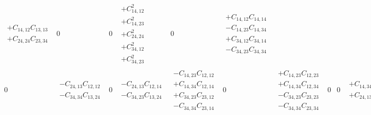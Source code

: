 \documentclass[pra,nofootinbib]{revtex4-1}
\newcommand{\C}[2]{C_{{#1},{#2}}}
\begin{document}
\begin{eqnarray}
\begin{array}{cccccccccccccccc}
\begin{array}{c}
     + \C{14}{12}\C{13}{13} \\
     + \C{24}{24}\C{23}{34} 
     \end{array} &
     0 &
     0 &
     \begin{array}{c}
     + \C{14}{12}^2 \\
     + \C{14}{23}^2 \\
     + \C{24}{24}^2 \\
     + \C{34}{12}^2 \\
     + \C{34}{23}^2 
     \end{array} &
     0 &
     \begin{array}{c}
     + \C{14}{12}\C{14}{14} \\
     - \C{14}{23}\C{14}{34} \\
     + \C{34}{12}\C{34}{14} \\
     - \C{34}{23}\C{34}{34} 
     \end{array} \\
     0 &
     \begin{array}{c}
     - \C{24}{13}\C{12}{12} \\
     - \C{34}{34}\C{13}{24} 
     \end{array} &
     0 &
     \begin{array}{c}
     - \C{24}{13}\C{12}{14} \\
     - \C{34}{23}\C{13}{24} 
     \end{array} &
     \begin{array}{c}
     - \C{14}{23}\C{12}{12} \\
     + \C{14}{34}\C{12}{14} \\
     + \C{34}{23}\C{23}{12} \\
     - \C{34}{34}\C{23}{14} 
     \end{array} &
     0 &
     \begin{array}{c}
     + \C{14}{23}\C{12}{23} \\
     + \C{14}{34}\C{12}{34} \\
     - \C{34}{23}\C{23}{23} \\
     - \C{34}{34}\C{23}{34} 
     \end{array} &
     0 &
     0 &
     \begin{array}{c}
     + \C{14}{34}\C{13}{24} \\
     + \C{24}{13}\C{23}{12} 
     \end{array} &
     0 &
     \begin{array}{c}
     + \C{14}{23}\C{13}{24} \\
     + \C{24}{13}\C{23}{14} 
     \end{array} &

\end{array}
\end{eqnarray}
\end{document}
